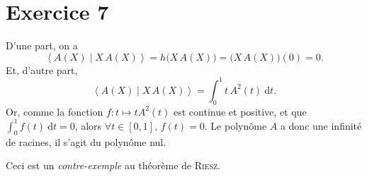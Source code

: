 \section{Exercice 7}

D'une part, on a \[
	\left<A(X)  \mid X\,A(X) \right> = h\big(X\,A(X)\big) = \big(X\, A(X)\big)(0) = 0
.\] 
Et, d'autre part, \[
	\left<A(X)  \mid X\, A(X) \right> = \int_{0}^{1} t\, A^2(t)~\mathrm{d}t
.\]
Or, comme la fonction $f: t \mapsto t A^2(t)$\/ est continue et positive, et que $\int_{0}^{1} f(t)~\mathrm{d}t = 0$, alors $\forall t \in [0,1]$, $f(t) = 0$.
Le polynôme $A$\/ a donc une infinité de racines, il s'agit du polynôme nul.

Ceci est un \textit{contre-exemple} au théorème de \textsc{Riesz}.


